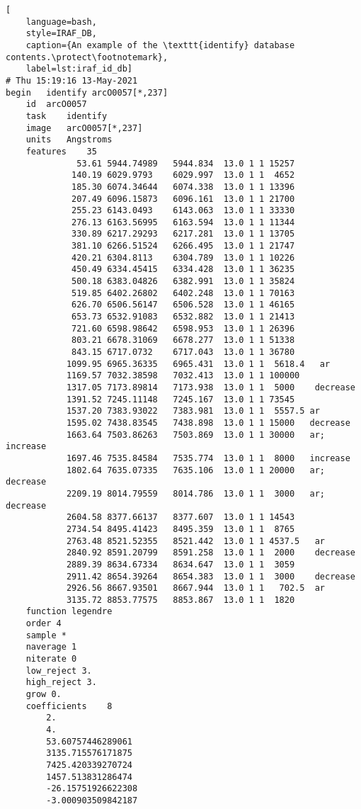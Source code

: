 \begin{lstlisting}[
    language=bash,
    style=IRAF_DB,
    caption={An example of the \texttt{identify} database contents.\protect\footnotemark},
    label=lst:iraf_id_db]
# Thu 15:19:16 13-May-2021
begin	identify arcO0057[*,237]
    id	arcO0057
    task	identify
    image	arcO0057[*,237]
    units	Angstroms
    features	35
              53.61 5944.74989   5944.834  13.0 1 1 15257
             140.19 6029.9793    6029.997  13.0 1 1  4652
             185.30 6074.34644   6074.338  13.0 1 1 13396
             207.49 6096.15873   6096.161  13.0 1 1 21700
             255.23 6143.0493    6143.063  13.0 1 1 33330
             276.13 6163.56995   6163.594  13.0 1 1 11344
             330.89 6217.29293   6217.281  13.0 1 1 13705
             381.10 6266.51524   6266.495  13.0 1 1 21747
             420.21 6304.8113    6304.789  13.0 1 1 10226
             450.49 6334.45415   6334.428  13.0 1 1 36235
             500.18 6383.04826   6382.991  13.0 1 1 35824
             519.85 6402.26802   6402.248  13.0 1 1 70163
             626.70 6506.56147   6506.528  13.0 1 1 46165
             653.73 6532.91083   6532.882  13.0 1 1 21413
             721.60 6598.98642   6598.953  13.0 1 1 26396
             803.21 6678.31069   6678.277  13.0 1 1 51338
             843.15 6717.0732    6717.043  13.0 1 1 36780
            1099.95 6965.36335   6965.431  13.0 1 1  5618.4   ar
            1169.57 7032.38598   7032.413  13.0 1 1 100000
            1317.05 7173.89814   7173.938  13.0 1 1  5000    decrease
            1391.52 7245.11148   7245.167  13.0 1 1 73545
            1537.20 7383.93022   7383.981  13.0 1 1  5557.5	ar
            1595.02 7438.83545   7438.898  13.0 1 1 15000   decrease
            1663.64 7503.86263   7503.869  13.0 1 1 30000	ar; increase
            1697.46 7535.84584   7535.774  13.0 1 1  8000   increase
            1802.64 7635.07335   7635.106  13.0 1 1 20000	ar; decrease
            2209.19 8014.79559   8014.786  13.0 1 1  3000	ar; decrease
            2604.58 8377.66137   8377.607  13.0 1 1 14543
            2734.54 8495.41423   8495.359  13.0 1 1  8765
            2763.48 8521.52355   8521.442  13.0 1 1 4537.5   ar
            2840.92 8591.20799   8591.258  13.0 1 1  2000    decrease
            2889.39 8634.67334   8634.647  13.0 1 1  3059
            2911.42 8654.39264   8654.383  13.0 1 1  3000    decrease
            2926.56 8667.93501   8667.944  13.0 1 1   702.5  ar
            3135.72 8853.77575   8853.867  13.0 1 1  1820
    function legendre
    order 4
    sample *
    naverage 1
    niterate 0
    low_reject 3.
    high_reject 3.
    grow 0.
    coefficients	8
        2.
        4.
        53.60757446289061
        3135.715576171875
        7425.420339270724
        1457.513831286474
        -26.15751926622308
        -3.000903509842187

\end{lstlisting}

